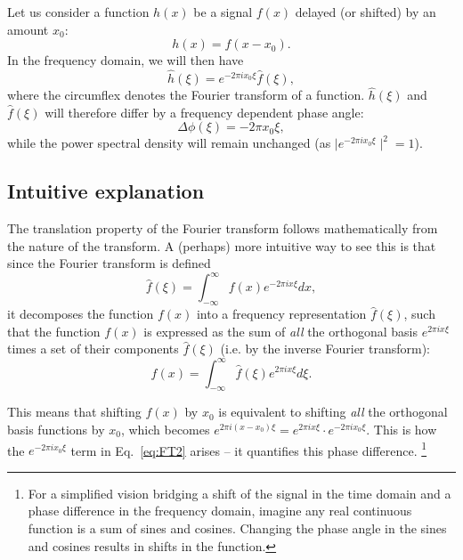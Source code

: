 Let us consider a function $h(x)$ be a signal $f(x)$ delayed (or shifted) by an amount $x_0$:
\begin{equation}
	h(x) = f(x-x_0).
\label{eq:FT1}
\end{equation}
In the frequency domain, we will then have 
\begin{equation}
	\hat{h}(\xi) = e^{-2 \pi ix_0 \xi} \hat{f}(\xi),
\label{eq:FT2}
\end{equation}
where the circumflex denotes the Fourier transform of a function. $\hat{h}(\xi)$ and $\hat{f}(\xi)$ 
will therefore differ by a frequency dependent phase angle: 
\begin{equation}
	\Delta \phi(\xi) = -2 \pi x_0 \xi,
\label{eq:PhaseShift}
\end{equation}
while the power spectral density will remain unchanged (as $\mid e^{-2 \pi ix_0 \xi}\mid ^2 = 1$).


\subsection{Intuitive explanation}

The translation property of the Fourier transform follows mathematically from the nature of the transform. 
A (perhaps) more intuitive way to see this is that since the Fourier transform is defined 
\begin{equation}
	\hat{f}(\xi) = \int_{-\infty}^{\infty} f(x) e^{-2 \pi ix \xi} dx, 
\label{eq:FT3}
\end{equation}
it decomposes the function $f(x)$ into a frequency representation $\hat{f}(\xi)$, such that the function $f(x)$ is expressed  
as the sum of \textit{all} the orthogonal basis $e^{2 \pi ix \xi}$ times a set of their components $\hat{f}(\xi)$ (i.e.
by the inverse Fourier transform):
\begin{equation}
	f(x) = \int_{-\infty}^{\infty} \hat{f}(\xi) e^{2 \pi ix \xi} d\xi. 
\end{equation}

This means that shifting $f(x)$ by $x_0$ is equivalent to shifting \textit{all} the orthogonal basis functions by $x_0$, which becomes $e^{2 \pi i(x-x_0) \xi} = e^{2 \pi i x \xi} \cdot e^{-2 \pi ix_0 \xi}$. This is how the $e^{-2 \pi ix_0 \xi}$ term in Eq.~\ref{eq:FT2} arises -- it quantifies this phase difference. 
\footnote{For a simplified vision bridging a shift of the signal in the time domain and a phase difference in the frequency domain, imagine any real continuous function is a sum of sines and cosines. Changing the phase angle in the sines and cosines results in shifts in the function.}

